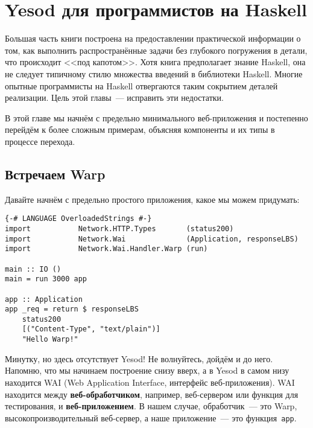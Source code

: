 \chapter{Yesod для программистов на Haskell}

Большая часть книги построена на предоставлении практической информации о том,
как выполнить распространённые задачи без глубокого погружения в детали, что
происходит <<под капотом>>. Хотя книга предполагает знание Haskell, она не
следует типичному стилю множества введений в библиотеки Haskell. Многие опытные
программисты на Haskell отвергаются таким сокрытием деталей реализации. Цель
этой главы~--- исправить эти недостатки.

В этой главе мы начнём с предельно минимального веб-приложения и постепенно
перейдём к более сложным примерам, объясняя компоненты и их типы в процессе
перехода.

\section{Встречаем Warp}

Давайте начнём с предельно простого приложения, какое мы можем придумать:
\begin{lstlisting}
{-# LANGUAGE OverloadedStrings #-}
import           Network.HTTP.Types       (status200)
import           Network.Wai              (Application, responseLBS)
import           Network.Wai.Handler.Warp (run)

main :: IO ()
main = run 3000 app

app :: Application
app _req = return $ responseLBS
    status200
    [("Content-Type", "text/plain")]
    "Hello Warp!"
\end{lstlisting}

Минутку, но здесь отсутствует Yesod! Не волнуйтесь, дойдём и до него. Напомню,
что мы начинаем построение снизу вверх, а в Yesod в самом низу находится WAI
(Web Application Interface, интерфейс веб-приложения). WAI находится между
\textbf{веб-обработчиком}, например, веб-сервером или функция для
тестирования, и \textbf{веб-приложением}. В нашем случае, обработчик~--- это
Warp, высокопроизводительный веб-сервер, а наше приложение~--- это
функция~\lstinline'app'.

